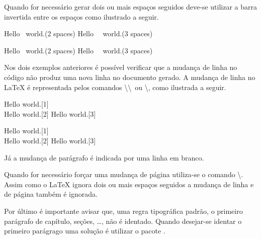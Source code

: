 Quando for necessário gerar dois ou mais espaços seguidos deve-se utilizar a barra invertida entre os espaços como ilustrado a seguir. \\
\begin{minipage}[t]{0.47\linewidth} \vspace{-8pt}
    \begin{latexcode}
        Hello \ world.(2 spaces)
        Hello \ \ world.(3 spaces)
    \end{latexcode}
\end{minipage} \hfill
\begin{minipage}[t]{0.47\linewidth} \vspace{0pt}
    Hello \ world.(2 spaces)
    Hello \ \ world.(3 spaces)
\end{minipage}

Nos dois exemplos anteriores é possível verificar que a mudança de linha no código não produz uma nova linha no documento gerado. A mudança de linha no LaTeX é representada pelos comandos \textbackslash\textbackslash \ ou \textbackslash{}, como ilustrada a seguir. \\
\begin{minipage}[t]{0.47\linewidth} \vspace{-8pt}
    \begin{latexcode}
        Hello world.[1] \\
        Hello world.[2] \newline
        Hello world.[3]
    \end{latexcode}
\end{minipage} \hfill
\begin{minipage}[t]{0.47\linewidth} \vspace{0pt}
    Hello world.[1] \\
    Hello world.[2] \newline
    Hello world.[3]
\end{minipage}

Já a mudança de parágrafo é indicada por uma linha em branco. 

Quando for necessário forçar uma mudança de página utiliza-se o comando \textbackslash{}. Assim como o LaTeX ignora dois ou mais espaços seguidos a mudança de linha e de página também é ignorada.

Por último é importante avisar que, uma regra tipográfica padrão, o primeiro parágrafo de  capítulo, seções, \dots, não é identado. Quando desejar-se identar o primeiro parágrago uma solução é utilizar o pacote .

